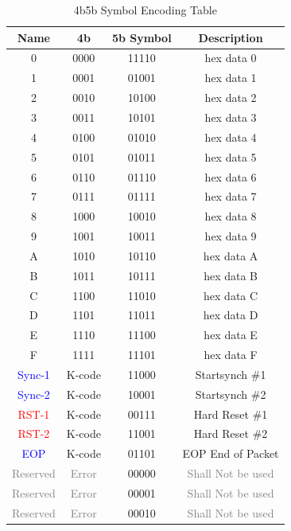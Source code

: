 \begin{table}[H]
    \centering
    \caption{4b5b Symbol Encoding Table}
    \begin{tabular}{|c|c|c|c|}
        \hline
        \textbf{Name} & \textbf{4b} & \textbf{5b Symbol} & \textbf{Description} \\
        \hline
        0 & 0000 & 11110 & hex data 0 \\
        1 & 0001 & 01001 & hex data 1 \\
        2 & 0010 & 10100 & hex data 2 \\
        3 & 0011 & 10101 & hex data 3 \\
        4 & 0100 & 01010 & hex data 4 \\
        5 & 0101 & 01011 & hex data 5 \\
        6 & 0110 & 01110 & hex data 6 \\
        7 & 0111 & 01111 & hex data 7 \\
        8 & 1000 & 10010 & hex data 8 \\
        9 & 1001 & 10011 & hex data 9 \\
        A & 1010 & 10110 & hex data A \\
        B & 1011 & 10111 & hex data B \\
        C & 1100 & 11010 & hex data C \\
        D & 1101 & 11011 & hex data D \\
        E & 1110 & 11100 & hex data E \\
        F & 1111 & 11101 & hex data F \\
        \hline
        \textcolor{blue}{Sync-1} & K-code & 11000 & Startsynch \#1 \\
        \textcolor{blue}{Sync-2} & K-code & 10001 & Startsynch \#2 \\
        \textcolor{red}{RST-1} & K-code & 00111 & Hard Reset \#1 \\
        \textcolor{red}{RST-2} & K-code & 11001 & Hard Reset \#2 \\
        \textcolor{blue}{EOP} & K-code & 01101 & EOP End of Packet \\
        \hline
        \textcolor{gray}{Reserved} & \textcolor{gray}{Error} & 00000 & \textcolor{gray}{Shall Not be used} \\
        \textcolor{gray}{Reserved} & \textcolor{gray}{Error} & 00001 & \textcolor{gray}{Shall Not be used} \\
        \textcolor{gray}{Reserved} & \textcolor{gray}{Error} & 00010 & \textcolor{gray}{Shall Not be used} \\

\end{tabular}
\end{table}
